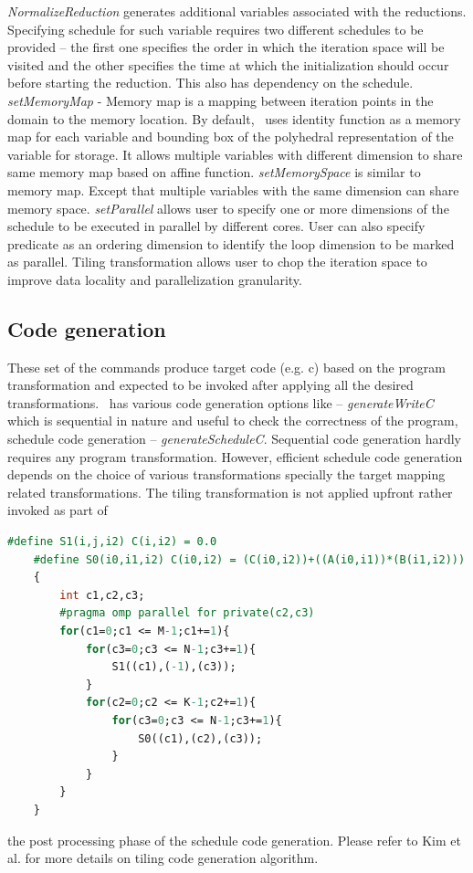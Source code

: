 \textit{NormalizeReduction} generates additional variables associated with the reductions. Specifying schedule for such variable requires two different schedules to be provided – the first one specifies the order in which the iteration space will be visited and the other specifies the time at which the initialization should occur before starting the reduction. This also has dependency on the schedule. \textit{setMemoryMap} - Memory map is a mapping between iteration points in the domain to the memory location. By default, \alphaz\ uses identity function as a memory map for each variable and bounding box of the polyhedral representation of the variable for storage. It allows multiple variables with different dimension to share same memory map based on affine function. \textit{setMemorySpace} is similar to memory map. Except that multiple variables with the same dimension can share memory space. \textit{setParallel} allows user to specify one or more dimensions of the schedule to be executed in parallel by different cores. User can also specify predicate as an ordering dimension to identify the loop dimension to be marked as parallel. Tiling transformation allows user to chop the iteration space to improve data locality and parallelization granularity. 
\subsection{Code generation}
These set of the commands produce target code (e.g. c) based on the program transformation and expected to be invoked after applying all the desired transformations. \alphaz\ has various code generation options like – \textit{generateWriteC} which is sequential in nature and useful to check the correctness of the program, schedule code generation – \textit{generateScheduleC}. Sequential code generation hardly requires any program transformation. However, efficient schedule code generation depends on the choice of various transformations specially the target mapping related transformations. The tiling transformation is not applied upfront rather invoked as part of
\begin{lstlisting}[language=Caml, caption=Generated code - Matrix multiplication]
    #define S1(i,j,i2) C(i,i2) = 0.0
    #define S0(i0,i1,i2) C(i0,i2) = (C(i0,i2))+((A(i0,i1))*(B(i1,i2)))
    {
        int c1,c2,c3;
        #pragma omp parallel for private(c2,c3)
        for(c1=0;c1 <= M-1;c1+=1){
	        for(c3=0;c3 <= N-1;c3+=1){
	            S1((c1),(-1),(c3));
	        }
            for(c2=0;c2 <= K-1;c2+=1){
                for(c3=0;c3 <= N-1;c3+=1){
                    S0((c1),(c2),(c3));
                }
            }
        }
    }
\end{lstlisting}
the post processing phase of the schedule code generation. Please refer to Kim et al. \cite{Kim2010} for more details on tiling code generation algorithm.

